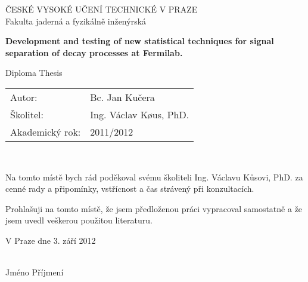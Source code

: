 \begin{center}
\hbox{}
\thispagestyle{empty}

{\Large ČESKÉ VYSOKÉ UČENÍ TECHNICKÉ V PRAZE} \\[3mm]
{\Large Fakulta jaderná a fyzikálně inženýrská}

\vspace{80mm}

{\LARGE\bf Development and testing of new statistical techniques for 
signal separation of decay processes at Fermilab. }


{\LARGE Diploma Thesis}


\end{center}

\begin{tabular}{ll} 
{\Large Autor:} & {\Large Bc. Jan Kučera} \\[1mm]
{\Large \v{S}kolitel:} & {\Large Ing. V\'{a}clav K\o{u}s, PhD.} \\[2mm]
{\Large Akademický rok:}     & {\Large 2011/2012}
\end{tabular}

\newpage 


\thispagestyle{empty}
\normalsize %
\ \vspace{10mm}

\noindent Na tomto místě bych rád poděkoval svému školiteli Ing. Václavu Kůsovi, PhD. za cenné rady a připomínky, vstřícnost a čas strávený při konzultacích. %


\vspace{0.5cm}

Prohlašuji na tomto místě, že jsem předloženou práci
vypracoval samostatně a že jsem uvedl veškerou použitou
literaturu.

\vspace{1.5cm}

\noindent
\begin{minipage}[b]{5cm}
V Praze dne 3. září 2012
\end{minipage}
\hfill
\begin{minipage}[t]{5cm}
\begin{center}
\dotfill\\
Jméno Příjmení
\end{center}
\end{minipage}

\vspace*{2cm}  

\newpage